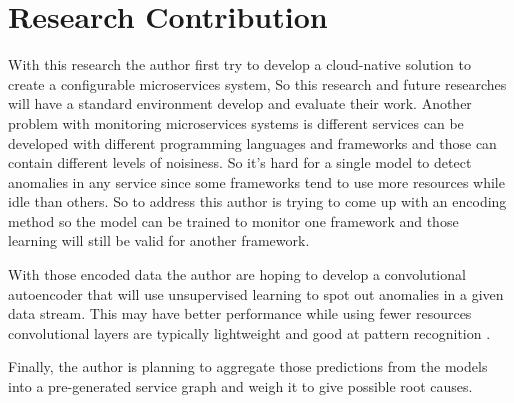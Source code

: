 \section{Research Contribution}

With this research the author first try to develop a cloud-native solution to create a configurable microservices system, So this research and future researches will have a standard environment develop and evaluate their work.
\label{need-for-encoding}
Another problem with monitoring microservices systems is different services can be developed with different programming languages and frameworks and those can contain different levels of noisiness. So it's hard for a single model to detect anomalies in any service since some frameworks tend to use more resources while idle than others.  So to address this author is trying to come up with an encoding method so the model can be trained to monitor one framework and those learning will still be valid for another framework.

With those encoded data the author are hoping to develop a convolutional autoencoder that will use unsupervised learning to spot out anomalies in a given data stream. This may have better performance while using fewer resources convolutional layers are typically lightweight and good at pattern recognition \citep{oord2016wavenet}.

Finally, the author is planning to aggregate those predictions from the models into a pre-generated service graph and weigh it to give possible root causes.
